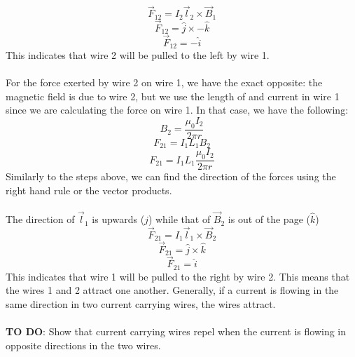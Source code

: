 \documentclass[9pt]{article}
\begin{document}
  	 $$\vec{F}_{12}=I_2\vec{l}_2\times\vec{B}_1$$
  	 $$\vec{F}_{12}=\hat{j}\times-\hat{k}$$
  	 $$\vec{F}_{12}=-\hat{i}$$
  	 This indicates that wire 2 will be pulled to the left by wire 1. \\ \\
  	 For the force exerted by wire 2 on wire 1, we have the exact opposite: the magnetic field is due to wire 2, but we use the length of and current in wire 1 since we are calculating the force on wire 1. In that case, we have the following:
  	 $$B_2=\dfrac{\mu_0I_2}{2\pi r}$$
  	 $$F_{21}=I_1L_1B_2$$
  	 $$F_{21}=I_1L_1\dfrac{\mu_0I_2}{2\pi r}$$
  	 Similarly to the steps above, we can find the direction of the forces using the right hand rule or the vector products. \\ \\
  	 The direction of $\vec{l}_1$ is upwards ($\hat{j}$) while that of $\vec{B}_2$ is out of the page ($\hat{k}$)  
  	 $$\vec{F}_{21}=I_1\vec{l}_1\times\vec{B}_2$$
  	 $$\vec{F}_{21}=\hat{j}\times\hat{k}$$
  	 $$\vec{F}_{21}=\hat{i}$$
  	 This indicates that wire 1 will be pulled to the right by wire 2. This means that the wires 1 and 2 attract one another. Generally, if a current is flowing in the same direction in two current carrying wires, the wires attract. \\ \\
  	 \textbf{TO DO}: Show that current carrying wires repel when the current is flowing in opposite directions in the two wires.
  	 
\end{document}
